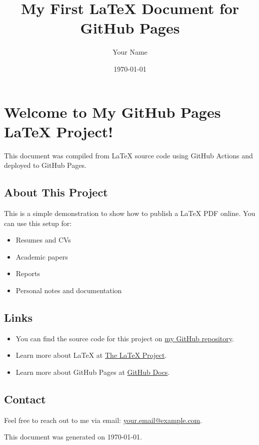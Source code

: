 \documentclass{article}
\title{My First LaTeX Document for GitHub Pages}
\author{Your Name}
\date{\today} %
\begin{document}
\maketitle

\section*{Welcome to My GitHub Pages LaTeX Project!}

This document was compiled from \LaTeX{} source code using GitHub Actions and deployed to GitHub Pages.

\subsection*{About This Project}
This is a simple demonstration to show how to publish a \LaTeX{} PDF online.
You can use this setup for:
\begin{itemize}
    \item Resumes and CVs
    \item Academic papers
    \item Reports
    \item Personal notes and documentation
\end{itemize}

\subsection*{Links}
\begin{itemize}
    \item You can find the source code for this project on \href{https://github.com/YourGitHubUsername/YourRepositoryName}{my GitHub repository}.
    \item Learn more about \LaTeX{} at \href{https://www.latex-project.org/}{The \LaTeX{} Project}.
    \item Learn more about GitHub Pages at \href{https://docs.github.com/en/pages}{GitHub Docs}.
\end{itemize}

\subsection*{Contact}
Feel free to reach out to me via email: \href{mailto:your.email@example.com}{your.email@example.com}.

\vfill %
\centering
\small This document was generated on \today.
\end{document}
